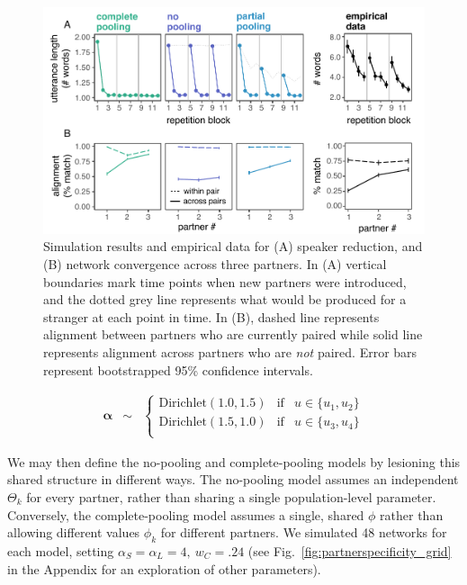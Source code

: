 \begin{figure}[t]
\centering
\includegraphics[scale=.8]{./figures/sec3-model-results.pdf}
\vspace{1em}
\caption{Simulation results and empirical data for (A) speaker reduction, and (B) network convergence across three partners. In (A) vertical boundaries mark time points when new partners were introduced, and the dotted grey line represents what would be produced for a stranger at each point in time. In (B), dashed line represents alignment between partners who are currently paired while solid line represents alignment across partners who are \emph{not} paired. Error bars represent bootstrapped 95\% confidence intervals.}
\label{fig:results}
\end{figure}


\begin{equation*}
\begin{array}{rcl}
 \boldsymbol{\alpha} & \sim& \left\{
\begin{array}{rcl}
  \textrm{Dirichlet}(1.0,1.5)& \textrm{if} & u \in \{u_1, u_2\}\\
  \textrm{Dirichlet}(1.5,1.0) & \textrm{if} &u \in \{u_3, u_4\}\\
\end{array}\right. 
\end{array}
\end{equation*}

We may then define the no-pooling and complete-pooling models by lesioning this shared structure in different ways. 
The no-pooling model assumes an independent $\Theta_k$ for every partner, rather than sharing a single population-level parameter.
Conversely, the complete-pooling model assumes a single, shared $\phi$ rather than allowing different values $\phi_k$ for different partners.
We simulated 48 networks for each model, setting $\alpha_S = \alpha_L = 4,~w_C = .24$ (see Fig.~\ref{fig:partnerspecificity_grid} in the Appendix for an exploration of other parameters).

